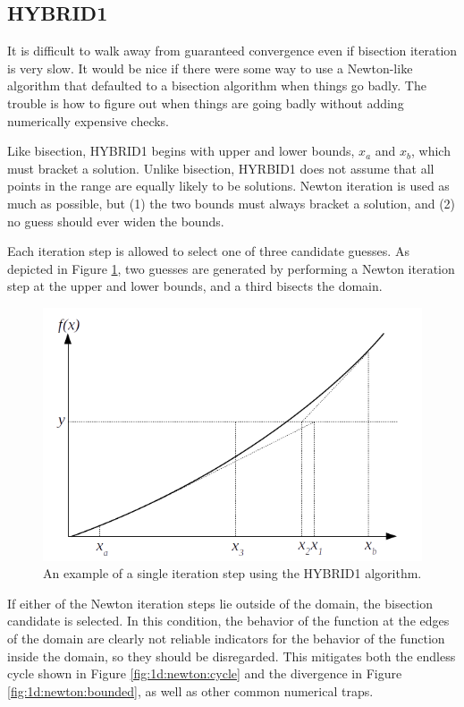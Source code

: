 \documentclass{article}
\begin{document}
\subsection{HYBRID1}

It is difficult to walk away from guaranteed convergence even if bisection iteration is very slow.  It would be nice if there were some way to use a Newton-like algorithm that defaulted to a bisection algorithm when things go badly.  The trouble is how to figure out when things are going badly without adding numerically expensive checks.

Like bisection, HYBRID1 begins with upper and lower bounds, $x_a$ and $x_b$, which must bracket a solution.  Unlike bisection, HYRBID1 does not assume that all points in the range are equally likely to be solutions.  Newton iteration is used as much as possible, but (1) the two bounds must always bracket a solution, and (2) no guess should ever widen the bounds.

Each iteration step is allowed to select one of three candidate guesses.  As depicted in Figure \ref{fig:1d:hybrid}, two guesses are generated by performing a Newton iteration step at the upper and lower bounds, and a third bisects the domain.  

\begin{figure}
\centering
\includegraphics[width = 0.8\linewidth]{figures/1d_hybrid}
\caption{An example of a single iteration step using the HYBRID1 algorithm.}\label{fig:1d:hybrid}
\end{figure}

If either of the Newton iteration steps lie outside of the domain, the bisection candidate is selected.  In this condition, the behavior of the function at the edges of the domain are clearly not reliable indicators for the behavior of the function inside the domain, so they should be disregarded.  This mitigates both the endless cycle shown in Figure \ref{fig:1d:newton:cycle} and the divergence in Figure \ref{fig:1d:newton:bounded}, as well as other common numerical traps.
\end{document}
